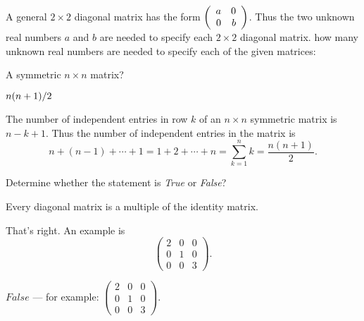 \documentclass{ximera}
\begin{document}
\noindent A general $2\times 2$ diagonal matrix has the form $\left(\begin{array}{rr} a & 0\\ 0 &b\end{array}\right)$.  Thus the two unknown real numbers $a$ and $b$ are needed to specify each $2\times 2$ diagonal matrix.  how many unknown real numbers are needed to specify each of the given matrices:

\begin{exercise}  \label{c1.3.3c}
A symmetric $n\times n$ matrix?   
\begin{prompt}$n(n+1)/2$\end{prompt}

\begin{solution}
The number of independent entries in row $k$ of an $n\times n$ symmetric matrix is $n-k+1$.  Thus the number of independent entries in the matrix is 
\[
n + (n-1) + \cdots + 1 = 1 + 2 + \cdots + n = \sum_{k=1}^n k = \frac{n(n + 1)}{2}.
\]
\end{solution}
\end{exercise}





\problemlabel

\noindent Determine whether the statement is {\em True\/} or {\em False\/}?

\begin{exercise} \label{c1.3.4b}
  Every diagonal matrix is a multiple of the identity matrix.
  \begin{multipleChoice}
  \end{multipleChoice}
  \begin{feedback}
    That's right.   An example is
    \[\left(\begin{array}{ccc}
              2 & 0 & 0 \\
              0 & 1 & 0 \\
              0 & 0 & 3 \end{array}\right).\]
  \end{feedback}

\begin{solution}
$False$ --- for example:
$\left(\begin{array}{ccc}
2 & 0 & 0 \\
0 & 1 & 0 \\
0 & 0 & 3 \end{array}\right)$.

\end{solution}
\end{exercise}
\end{document}
